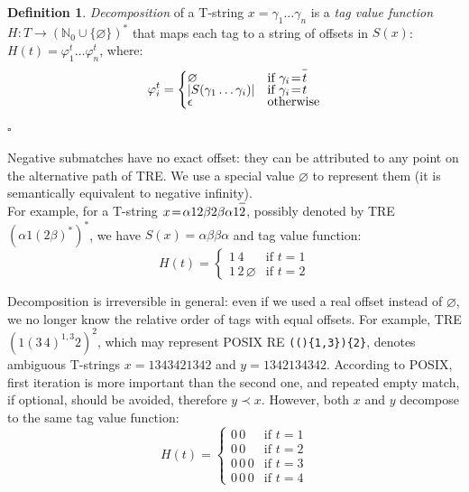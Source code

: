 \documentclass{article}
\newcommand{\Xeq}{\!=\!}
\newcommand{\YN}{\mathbb{N}}
\newcommand*{\Xbar}[1]{\overline{#1\vphantom{\bar{#1}}}}
\theoremstyle{definition}
\newtheorem{Xdef}{Definition}
\begin{document}
\begin{multicols}{2}
    \begin{Xdef}\label{tagvalfun}
    \emph{Decomposition} of a T-string $x \Xeq \gamma_1 \dots \gamma_n$
    is a \emph{tag value function} $H: T \rightarrow (\YN_0 \cup \{ \varnothing \})^*$
    that maps each tag to a string of offsets in $S(x)$:
    $H(t) \Xeq \varphi^t_1 \dots \varphi^t_n$, where:
    $$\varphi^t_i = \begin{cases}
            \varnothing &\text{if } \gamma_i \Xeq \Xbar{t} \\[-0.5em]
            |S(\gamma_1 \dots \gamma_i)| &\text{if } \gamma_i \Xeq t \\[-0.5em]
            \epsilon &\text{otherwise}
        \end{cases}$$
    $\square$
    \end{Xdef}

Negative submatches have no exact offset: they can be attributed to any point on the alternative path of TRE.
We use a special value $\varnothing$ to represent them
(it is semantically equivalent to negative infinity).
\\

For example, for a T-string $x \Xeq \alpha 1 2 \beta 2 \beta \alpha 1 \Xbar{2}$,
possibly denoted by TRE $(\alpha 1 (2 \beta)^*)^*$, we have
$S(x) \Xeq \alpha \beta \beta \alpha$ and tag value function:
    $$H(t) \Xeq \begin{cases}
        1 \, 4 &\text{if } t \Xeq 1 \\[-0.5em]
        1 \, 2 \, \varnothing &\text{if } t \Xeq 2
    \end{cases}$$

Decomposition is irreversible in general:
even if we used a real offset instead of $\varnothing$, we no longer know the relative order of tags with equal offsets.
For example, TRE $(1 (3 \, 4)^{1,3} 2)^{2}$,
which may represent POSIX RE \texttt{(()\{1,3\})\{2\}},
denotes ambiguous T-strings $x \Xeq 1 3 4 3 4 2 1 3 4 2$ and $y \Xeq 1 3 4 2 1 3 4 3 4 2$.
According to POSIX, first iteration is more important than the second one,
and repeated empty match, if optional, should be avoided, therefore $y \prec x$.
However, both $x$ and $y$ decompose to the same tag value function:
    $$H(t) \Xeq \begin{cases}
        0 \, 0 &\text{if } t \Xeq 1 \\[-0.5em]
        0 \, 0 &\text{if } t \Xeq 2 \\[-0.5em]
        0 \, 0 \, 0 &\text{if } t \Xeq 3\\[-0.5em]
        0 \, 0 \, 0 &\text{if } t \Xeq 4
    \end{cases}$$


\end{multicols}
\end{document}
